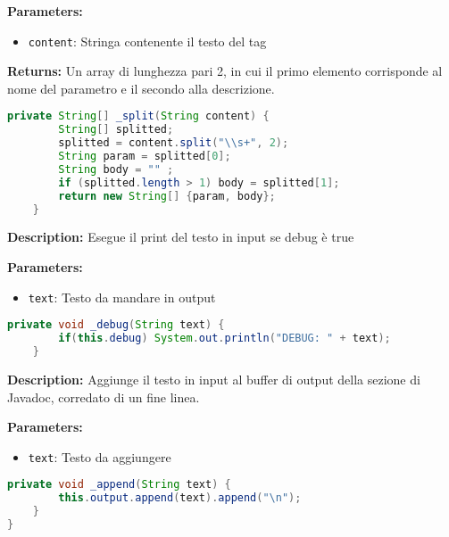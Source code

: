 \textbf{Parameters:}
\begin{itemize}
  \item\texttt{content}: Stringa contenente il testo del tag 
\end{itemize}

\textbf{Returns:}
Un array di lunghezza pari 2, in cui il primo elemento corrisponde al nome del parametro e il secondo alla descrizione.

\begin{lstlisting}[language=Java]
    private String[] _split(String content) {
        String[] splitted;
        splitted = content.split("\\s+", 2);
        String param = splitted[0];
        String body = "" ;
        if (splitted.length > 1) body = splitted[1];
        return new String[] {param, body};
    }
\end{lstlisting}
\vspace{0.5cm}
\textbf{Description:}  Esegue il print del testo in input se debug è true 

\textbf{Parameters:}
\begin{itemize}
  \item\texttt{text}: Testo da mandare in output
\end{itemize}

\begin{lstlisting}[language=Java]
    private void _debug(String text) {
        if(this.debug) System.out.println("DEBUG: " + text);
    }
\end{lstlisting}
\vspace{0.5cm}
\textbf{Description:}  Aggiunge il testo in input al buffer di output della sezione di Javadoc, corredato di un fine linea. 

\textbf{Parameters:}
\begin{itemize}
  \item\texttt{text}: Testo da aggiungere
\end{itemize}

\begin{lstlisting}[language=Java]
    private void _append(String text) {
        this.output.append(text).append("\n");
    }
}
\end{lstlisting}
